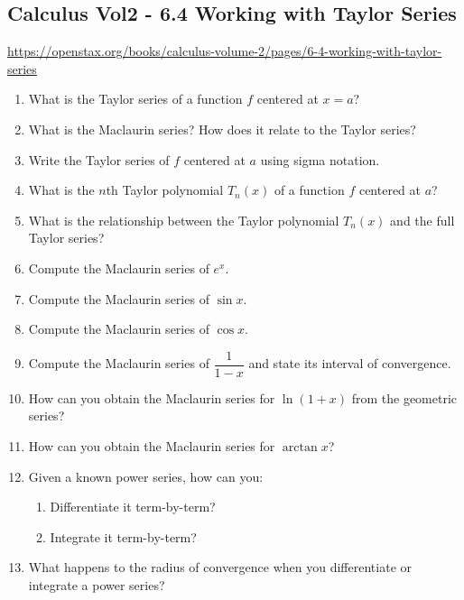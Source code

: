 \subsection{Calculus Vol2 - 6.4 Working with Taylor Series}

\url{https://openstax.org/books/calculus-volume-2/pages/6-4-working-with-taylor-series}

\begin{enumerate}

\item What is the Taylor series of a function $f$ centered at $x=a$?

\item What is the Maclaurin series? How does it relate to the Taylor series?

\item Write the Taylor series of $f$ centered at $a$ using sigma notation.

\item What is the $n$th Taylor polynomial $T_n(x)$ of a function $f$ centered at $a$?

\item What is the relationship between the Taylor polynomial $T_n(x)$ and the full Taylor series?

\item Compute the Maclaurin series of $e^x$.

\item Compute the Maclaurin series of $\sin x$.

\item Compute the Maclaurin series of $\cos x$.

\item Compute the Maclaurin series of $\dfrac{1}{1-x}$ and state its interval of convergence.

\item How can you obtain the Maclaurin series for $\ln(1+x)$ from the geometric series?

\item How can you obtain the Maclaurin series for $\arctan x$?

\item Given a known power series, how can you:
  \begin{enumerate}
    \item Differentiate it term-by-term?
    \item Integrate it term-by-term?
  \end{enumerate}

\item What happens to the radius of convergence when you differentiate or integrate a power series?


\end{enumerate}
